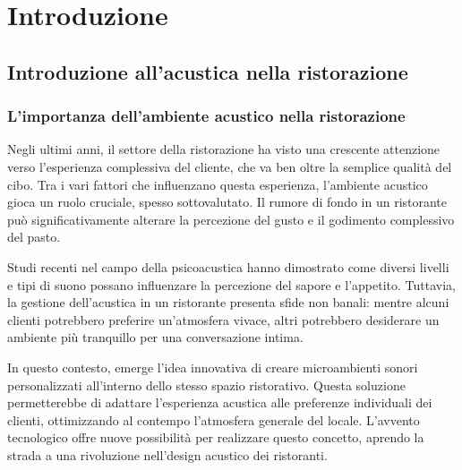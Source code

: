
%

\chapter{Introduzione}
\label{cha:introduzione}


\section{Introduzione all’acustica nella ristorazione}

\subsection{L'importanza dell'ambiente acustico nella ristorazione}
\noindent

Negli ultimi anni, il settore della ristorazione ha visto una crescente attenzione verso l'esperienza complessiva del cliente, che va ben oltre la semplice qualità del cibo. Tra i vari fattori che influenzano questa esperienza, l'ambiente acustico gioca un ruolo cruciale, spesso sottovalutato. Il rumore di fondo in un ristorante può significativamente alterare la percezione del gusto e il godimento complessivo del pasto. \cite{castro2016percezione}

Studi recenti nel campo della psicoacustica hanno dimostrato come diversi livelli e tipi di suono possano influenzare la percezione del sapore e l'appetito. Tuttavia, la gestione dell'acustica in un ristorante presenta sfide non banali: mentre alcuni clienti potrebbero preferire un'atmosfera vivace, altri potrebbero desiderare un ambiente più tranquillo per una conversazione intima. \cite{rindel2019}

In questo contesto, emerge l'idea innovativa di creare microambienti sonori personalizzati all'interno dello stesso spazio ristorativo. Questa soluzione permetterebbe di adattare l'esperienza acustica alle preferenze individuali dei clienti, ottimizzando al contempo l'atmosfera generale del locale. L'avvento tecnologico offre nuove possibilità per realizzare questo concetto, aprendo la strada a una rivoluzione nell'design acustico dei ristoranti.

